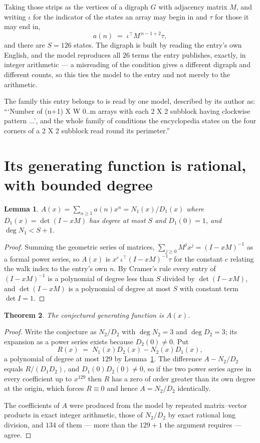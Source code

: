 \documentclass[11pt,a4paper]{article}
\theoremstyle{plain}
\newtheorem{theorem}{Theorem}
\newtheorem{lemma}[theorem]{Lemma}
\theoremstyle{definition}
\begin{document}
Taking those strips as the vertices of a digraph $G$ with adjacency matrix $M$, and writing
$\iota$ for the indicator of the states an array may begin in and $\tau$ for those it may end
in,
\[
a(n)\;=\;\iota^{\!\top}M^{\,n-1+2}\tau ,
\]
and there are $S=126$ states. The digraph is built by reading the entry's own English, and the
model reproduces all $26$ terms the entry publishes, exactly, in integer arithmetic --- a
misreading of the condition gives a different digraph and different counts, so this ties the
model to the entry and not merely to the arithmetic.

The family this entry belongs to is read by one model, described by its author as: ```Number of (n+1) X W 0..m arrays with each 2 X 2 subblock having clockwise pattern ...', and the whole family of conditions the encyclopedia states on the four corners of a 2 X 2 subblock read round its perimeter.''


\section{Its generating function is rational, with bounded degree}

\begin{lemma}\label{lem:rat}
$A(x)=\sum_{n\ge1}a(n)x^n=N_1(x)/D_1(x)$ where $D_1(x)=\det(I-xM)$ has degree at most
$S$ and $D_1(0)=1$, and $\deg N_1<S+1$.
\end{lemma}

\begin{proof}
Summing the geometric series of matrices, $\sum_{j\ge0}M^jx^j=(I-xM)^{-1}$ as a formal
power series, so $A(x)$ is $x^{c}\,\iota^{\!\top}(I-xM)^{-1}\tau$ for the constant $c$
relating the walk index to the entry's own $n$. By Cramer's rule every entry of
$(I-xM)^{-1}$ is a polynomial of degree less than $S$ divided by $\det(I-xM)$, and
$\det(I-xM)$ is a polynomial of degree at most $S$ with constant term $\det I=1$.
\end{proof}

\begin{theorem}
The conjectured generating function is $A(x)$.
\end{theorem}

\begin{proof}
Write the conjecture as $N_2/D_2$ with $\deg N_2=3$ and $\deg D_2=3$; its expansion as a
power series exists because $D_2(0)\neq0$. Put
\[
R(x)\;=\;N_1(x)D_2(x)-N_2(x)D_1(x),
\]
a polynomial of degree at most $129$ by Lemma~\ref{lem:rat}. The difference
$A-N_2/D_2$ equals $R/(D_1D_2)$, and $D_1(0)D_2(0)\neq0$, so if the two power series agree in
every coefficient up to $x^{129}$ then $R$ has a zero of order greater than its own
degree at the origin, which forces $R\equiv0$ and hence $A=N_2/D_2$ identically.

The coefficients of $A$ were produced from the model by repeated matrix--vector products in
exact integer arithmetic, those of $N_2/D_2$ by exact rational long division, and $134$
of them --- more than the $129+1$ the argument requires --- agree.
\end{proof}
\end{document}

